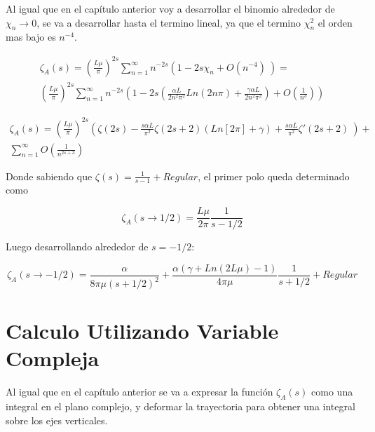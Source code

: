 Al igual que en el capítulo anterior voy a desarrollar el binomio alrededor de  $\chi _n \rightarrow 0$, se va a desarrollar hasta el termino lineal, ya que el termino $\chi _n ^2 $ el orden mas bajo es $n ^{-4} $. 


\begin{equation}
\begin{array}{c}
    \zeta _A (s) = ( \frac{L \mu}{\pi} ) ^{2 s}
    \sum _{n=1} ^{\infty} 
    n ^{-2s}
    \left(
    1 - 2 s \chi _n + O(n ^{-4}) \
    \right) =  \\
    ( \frac{L \mu }{\pi} ) ^{2 s}
    \sum _{n=1} ^{\infty} n ^{-2 s} 
    \left(
    1 - 2s \left(
    \frac{\alpha L }{2 n ^2 \pi ^2} Ln( 2  n \pi) + 
    \frac{\gamma \alpha L }{2 n ^2 \pi ^2} 
	\right) +
    O (\frac{1}{n ^{3} }  )
    \right)
\end{array}
\end{equation}


\begin{equation}
\begin{array}{c}
    \zeta _A (s) = 
    \left( \frac{L \mu }{ \pi } \right) ^{2 s}  
    \left(
    \zeta (2 s) -
	\frac{ s \alpha L}{ \pi ^2} \zeta (2s+2)
	\left(
	   Ln[2  \pi ] + \gamma
	\right) +
    \frac{s \alpha L}{\pi ^2}
	\zeta '(2s+2) \
	\right) + \\
    \sum _{n=1} ^{\infty} O \left( \frac{1}{n ^{2s+3}} \right)
\end{array}
\end{equation}

Donde sabiendo que $\zeta(s) = \frac{1}{s-1} + Regular$, el primer polo queda determinado como

\begin{equation}
    \zeta _A (s \rightarrow 1/2) = \frac{L \mu }{2 \pi} \frac{1}{s-1/2}    
\end{equation}

Luego desarrollando alrededor de $s=-1/2$:

\begin{equation}
    \zeta _A (s \rightarrow -1/2 ) =  \frac{\alpha}{8  \pi \mu (s+1/2)^2} +
     \frac{ \alpha ( \gamma  + Ln(2L \mu ) -1 ) }{4  \pi \mu } \frac{1}{s+1/2} + 
    Regular
\end{equation}

\section{Calculo Utilizando Variable Compleja}


Al igual que en el capítulo anterior se va a expresar la función $\zeta _A (s)$ como una integral en el plano complejo, y deformar la trayectoria para obtener una integral sobre los ejes verticales. \\

